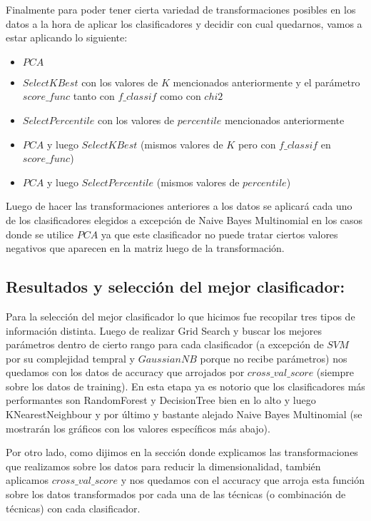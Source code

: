\documentclass[a4paper]{article}
\begin{document}
Finalmente para poder tener cierta variedad de transformaciones posibles en los datos a la hora de aplicar los clasificadores y decidir con cual quedarnos, vamos a estar aplicando lo siguiente:
\begin{itemize}
\item $PCA$
\item $SelectKBest$ con los valores de $K$ mencionados anteriormente y el parámetro $score\_func$ tanto con $f\_classif$ como con $chi2$
\item $SelectPercentile$ con los valores de $percentile$ mencionados anteriormente
\item $PCA$ y luego $SelectKBest$ (mismos valores de $K$ pero con $f\_classif$ en $score\_func$)
\item $PCA$ y luego $SelectPercentile$ (mismos valores de $percentile$)
\end{itemize}

Luego de hacer las transformaciones anteriores a los datos se aplicará cada uno de los clasificadores elegidos a excepción de Naive Bayes Multinomial en los casos donde se utilice $PCA$ ya que este clasificador no puede tratar ciertos valores negativos que aparecen en la matriz luego de la transformación.

\newpage

\subsection{Resultados y selección del mejor clasificador:}
Para la selección del mejor clasificador lo que hicimos fue recopilar tres tipos de información distinta. Luego de realizar Grid Search y buscar los mejores parámetros dentro de cierto rango para cada clasificador (a excepción de $SVM$ por su complejidad tempral y $GaussianNB$ porque no recibe parámetros) nos quedamos con los datos de accuracy que arrojados por $cross\_val\_score$ (siempre sobre los datos de training). En esta etapa ya es notorio que los clasificadores más performantes son RandomForest y DecisionTree bien en lo alto y luego KNearestNeighbour y por último y bastante alejado Naive Bayes Multinomial (se mostrarán los gráficos con los valores específicos más abajo).

Por otro lado, como dijimos en la sección donde explicamos las transformaciones que realizamos sobre los datos para reducir la dimensionalidad, también aplicamos $cross\_val\_score$ y nos quedamos con el accuracy que arroja esta función sobre los datos transformados por cada una de las técnicas (o combinación de técnicas) con cada clasificador.
\end{document}
